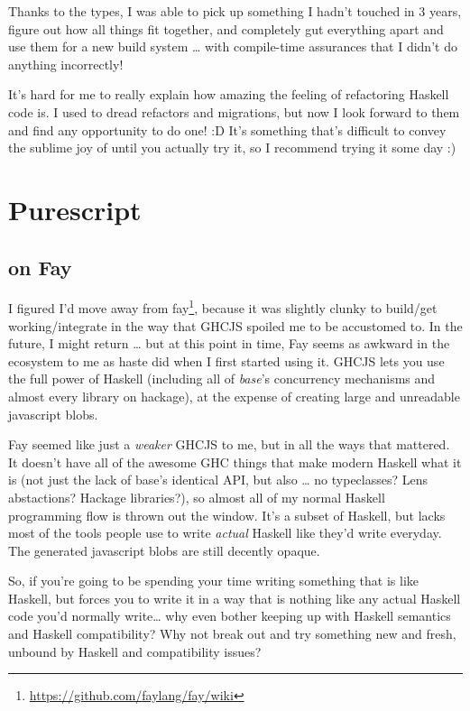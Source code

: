 \documentclass[]{article}
\renewcommand{\href}[2]{#2\footnote{\url{#1}}}
\begin{document}
Thanks to the types, I was able to pick up something I hadn't touched in
3 years, figure out how all things fit together, and completely gut
everything apart and use them for a new build system \ldots{} with
compile-time assurances that I didn't do anything incorrectly!

It's hard for me to really explain how amazing the feeling of
refactoring Haskell code is. I used to dread refactors and migrations,
but now I look forward to them and find any opportunity to do one! :D
It's something that's difficult to convey the sublime joy of until you
actually try it, so I recommend trying it some day :)

\section{Purescript}\label{purescript}

\subsection{on Fay}\label{on-fay}

I figured I'd move away from
\href{https://github.com/faylang/fay/wiki}{fay}, because it was slightly
clunky to build/get working/integrate in the way that GHCJS spoiled me
to be accustomed to. In the future, I might return \ldots{} but at this
point in time, Fay seems as awkward in the ecosystem to me as haste did
when I first started using it. GHCJS lets you use the full power of
Haskell (including all of \emph{base}'s concurrency mechanisms and
almost every library on hackage), at the expense of creating large and
unreadable javascript blobs.

Fay seemed like just a \emph{weaker} GHCJS to me, but in all the ways
that mattered. It doesn't have all of the awesome GHC things that make
modern Haskell what it is (not just the lack of base's identical API,
but also \ldots{} no typeclasses? Lens abstactions? Hackage libraries?),
so almost all of my normal Haskell programming flow is thrown out the
window. It's a subset of Haskell, but lacks most of the tools people use
to write \emph{actual} Haskell like they'd write everyday. The generated
javascript blobs are still decently opaque.

So, if you're going to be spending your time writing something that is
like Haskell, but forces you to write it in a way that is nothing like
any actual Haskell code you'd normally write\ldots{} why even bother
keeping up with Haskell semantics and Haskell compatibility? Why not
break out and try something new and fresh, unbound by Haskell and
compatibility issues?
\end{document}
